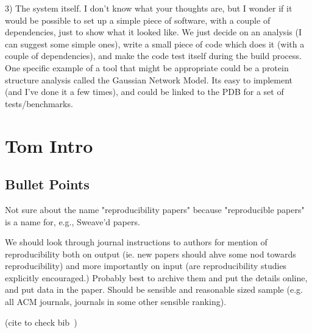 \documentclass{article}
\begin{document}
 

3) The system itself. I don't know what your thoughts are, but I
wonder if it would be possible to set up a simple piece of software,
with a couple of dependencies, just to show what it looked like. We
just decide on an analysis (I can suggest some simple ones), write a
small piece of code which does it (with a couple of dependencies), and
make the code test itself during the build process. One specific
example of a tool that might be appropriate could be a protein
structure analysis called the Gaussian Network Model. Its easy to
implement (and I've done it a few times), and could be linked to the
PDB for a set of tests/benchmarks.





\section{Tom Intro}

\subsection{Bullet Points}
Not sure about the name "reproducibility papers" because "reproducible
papers" is a name for, e.g., Sweave'd papers.

We should look through journal instructions to authors for mention of
reproducibility both on output (ie. new papers should ahve some nod
towards reproducibility) and more importantly on input (are
reproducibility studies explicitly encouraged.)  Probably best to
archive them and put the details online, and put data in the
paper. Should be sensible and reasonable sized sample (e.g. all ACM
journals, journals in some other sensible ranking).

(cite to check bib~\cite{crick-et-al_wssspe2})
\end{document}
